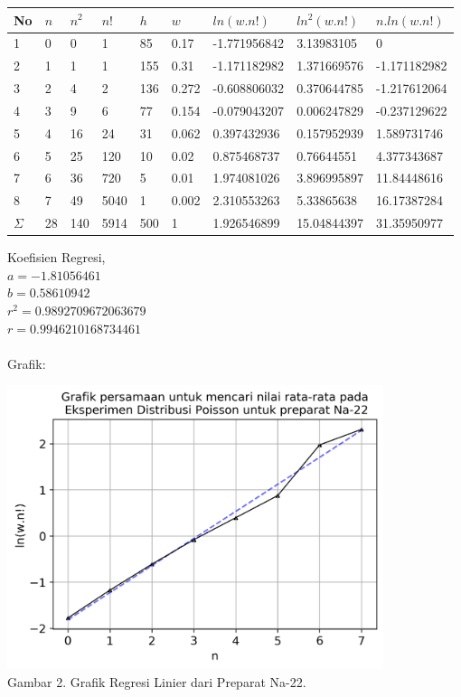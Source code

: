\documentclass{article}
\begin{document}
			\begin{longtable}{@{}lllllllll@{}}
					\toprule
					No  & $n$  & $n^{2}$ & $n!$   & $h$   & $w$     & $ln(w.n!)$     & $ln^{2}(w.n!)$ & $n.ln(w.n!)$   \\ \midrule
				\endfirsthead
				\endhead
				\bottomrule
				\endfoot
				\endlastfoot
				1   & 0  & 0                    & 1    & 85  & 0.17  & -1.771956842 & 3.13983105                  & 0            \\
				2   & 1  & 1                    & 1    & 155 & 0.31  & -1.171182982 & 1.371669576                 & -1.171182982 \\
				3   & 2  & 4                    & 2    & 136 & 0.272 & -0.608806032 & 0.370644785                 & -1.217612064 \\
				4   & 3  & 9                    & 6    & 77  & 0.154 & -0.079043207 & 0.006247829                 & -0.237129622 \\
				5   & 4  & 16                   & 24   & 31  & 0.062 & 0.397432936  & 0.157952939                 & 1.589731746  \\
				6   & 5  & 25                   & 120  & 10  & 0.02  & 0.875468737  & 0.76644551                  & 4.377343687  \\
				7   & 6  & 36                   & 720  & 5   & 0.01  & 1.974081026  & 3.896995897                 & 11.84448616  \\
				8   & 7  & 49                   & 5040 & 1   & 0.002 & 2.310553263  & 5.33865638                  & 16.17387284  \\* \midrule
				$\Sigma$ & 28 & 140                  & 5914 & 500 & 1     & 1.926546899  & 15.04844397                 & 31.35950977  \\* \bottomrule
				\end{longtable}
			\hspace{-0.6cm}Koefisien Regresi, \\
			$a = -1.81056461$ \\
			$b = 0.58610942$ \\
			$r^{2} = 0.9892709672063679$ \\
			$r = 0.9946210168734461 $ \\ \\
			Grafik: 
			\begin{center}
				\includegraphics[width=110mm]{Data/Na-22-Graph.png}\\
				Gambar 2. Grafik Regresi Linier dari Preparat Na-22.
			\end{center}
\end{document}
